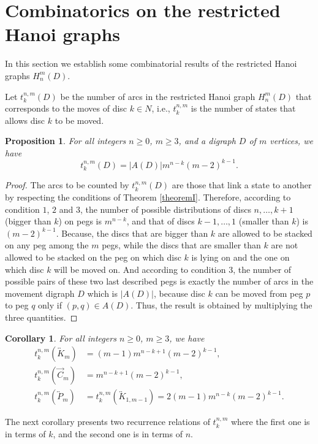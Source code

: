 \documentclass[letterpaper,11pt]{article}
\newtheorem{proposition}{Proposition}
\newtheorem{corollary}{Corollary}
\begin{document}
\section{Combinatorics on the restricted Hanoi graphs}
In this section we establish some combinatorial results of the restricted Hanoi graphs $H_{n}^{m}(D)$.

Let $t_{k}^{n,m}(D)$ be the number of arcs in the restricted  Hanoi graph $H_{n}^{m}(D)$  that corresponds to the moves of disc $k\in N$, i.e., $t_{k}^{n,m}$ is the number of states that allows disc $k$ to be moved.
\begin{proposition}\label{theo_tknmD}
For all integers $n\geq0$, $m\geq 3$, and a digraph $D$ of $m$ vertices, we have
        \begin{equation}
        t_{k}^{n,m}(D)=|A(D)|m^{n-k}(m-2)^{k-1}.
    \end{equation}
\end{proposition}
\begin{proof}
The arcs to be counted by $t_{k}^{n,m}(D)$  are those that link a state to another by respecting the conditions of Theorem \ref{theoremI}. Therefore, according to condition $1$, $2$ and $3$, the number of possible distributions of discs $n,\ldots,k+1$ (bigger than $k$) on pegs is $m^{n-k}$, and that of  discs $k-1,\ldots,1$ (smaller than $k$) is $(m-2)^{k-1}$. Because, the discs that are bigger than $k$ are allowed to be stacked on any peg among the $m$ pegs, while the discs that are smaller than $k$ are not allowed to be stacked on the peg on which disc $k$ is lying on and the one on which disc $k$ will be moved on. And according to condition $3$, the number of possible pairs of these two last described pegs is exactly the number of arcs in the movement digraph $D$ which is $|A(D)|$, because disc $k$ can be moved from peg $p$ to peg $q$ only if $(p,q)\in A(D)$. Thus, the result is obtained by multiplying the three quantities.

\end{proof}
\begin{corollary}
   For all integers $n\geq0$, $m\geq 3$, we have
   \begin{align}
       t_{k}^{n,m}(\overleftrightarrow{K}_{m})&=(m-1)m^{n-k+1}(m-2)^{k-1},\\
       t_{k}^{n,m}(\overrightarrow{C}_{m})&=m^{n-k+1}(m-2)^{k-1},\\
        t_{k}^{n,m}(\overleftrightarrow{P}_{m})&=t_{k}^{n,m}(\overleftrightarrow{K}_{1,m-1})=2(m-1)m^{n-k}(m-2)^{k-1}.
   \end{align}
\end{corollary}
The next corollary presents two recurrence relations of $t_{k}^{n,m}$ where the first one is in terms of $k$, and the second one is in terms of $n$. 
\end{document}
